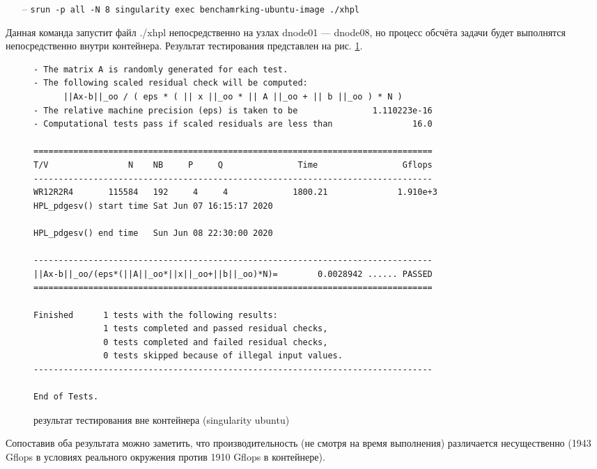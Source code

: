\documentclass[a4paper]{extarticle}
\begin{document}
\begin{itemize}
\item[--] \verb|srun -p all -N 8 singularity exec benchamrking-ubuntu-image ./xhpl|
\end{itemize}

Данная команда запустит файл ./xhpl непосредственно на узлах dnode01 --- dnode08, но процесс обсчёта задачи будет выполнятся непосредственно внутри контейнера. Результат тестирования представлен на рис.  \ref{fig:hplres2}.

\begin{figure}[H]
\begin{verbatim}
- The matrix A is randomly generated for each test.
- The following scaled residual check will be computed:
      ||Ax-b||_oo / ( eps * ( || x ||_oo * || A ||_oo + || b ||_oo ) * N )
- The relative machine precision (eps) is taken to be               1.110223e-16
- Computational tests pass if scaled residuals are less than                16.0

================================================================================
T/V                N    NB     P     Q               Time                 Gflops
--------------------------------------------------------------------------------
WR12R2R4       115584   192     4     4             1800.21              1.910e+3
HPL_pdgesv() start time Sat Jun 07 16:15:17 2020

HPL_pdgesv() end time   Sun Jun 08 22:30:00 2020

--------------------------------------------------------------------------------
||Ax-b||_oo/(eps*(||A||_oo*||x||_oo+||b||_oo)*N)=        0.0028942 ...... PASSED
================================================================================

Finished      1 tests with the following results:
              1 tests completed and passed residual checks,
              0 tests completed and failed residual checks,
              0 tests skipped because of illegal input values.
--------------------------------------------------------------------------------

End of Tests.
\end{verbatim}
\captionsetup{labelfont=bf, labelsep=space}
\caption{результат тестирования вне контейнера (singularity ubuntu)}
\label{fig:hplres2}
\end{figure}

Сопоставив оба результата можно заметить, что производительность (не смотря на время выполнения) различается несущественно (1943 Gflops в условиях реального окружения против 1910 Gflops в контейнере). 
\end{document}
